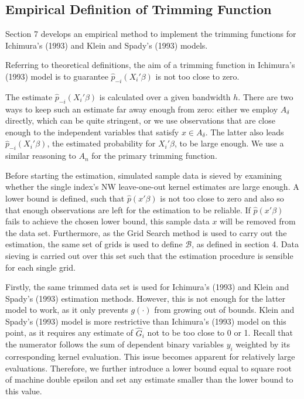 \documentclass[a4paper]{article}
\begin{document}
\subsection{Empirical Definition of Trimming Function}
Section 7 develops an empirical method to implement the trimming functions for Ichimura's (1993) \cite{[6]} and Klein and Spady's (1993) \cite{[12]} models.

Referring to theoretical definitions, the aim of a trimming function in Ichimura's (1993) \citep{[6]} model is to guarantee $\hat{p}_{-i}(X_i'\beta)$ is not too close to zero. 

The estimate $\hat{p}_{-i}(X_i'\beta)$ is calculated over a given bandwidth $h$. There are two ways to keep such an estimate far away enough from zero: either we  employ $A_\delta$  directly, which can be quite stringent, or we use observations that are close enough to the independent variables that satisfy $x \in A_\delta$. The latter also leads $\hat{p}_{-i}(X_i'\beta)$, the estimated probability for $X_i'\beta$, to be large enough. We use a similar reasoning to $A_n$ for the primary trimming function.

Before starting the estimation, simulated sample data is sieved by examining whether the single index's NW leave-one-out kernel estimates are large enough. A lower bound is defined, such that $\hat{p}(x'\beta)$ is not too close to zero and also so that enough observations are left  for the estimation to be reliable. If $\hat{p}(x'\beta)$ fails to achieve the chosen lower bound, this sample data $x$ will be removed from the data set.
Furthermore, as the Grid Search method is used to carry out the estimation, the same set of grids is used to define $\mathcal{B}$, as defined in section 4. Data sieving is carried out over this set such that the estimation procedure is sensible for each single grid.

Firstly, the same trimmed data set is used for Ichimura's (1993) \cite{[6]} and Klein and Spady's (1993) \cite{[12]} estimation methods. However, this is not enough for the latter model to work, as it only prevents $g(\cdot)$ from growing out of bounds.  Klein and Spady's (1993) \cite{[12]} model is more restrictive than Ichimura's (1993) \cite{[6]} model on this point, as it requires any estimate of $\hat{G}_i$ not to be too close to 0 or 1. Recall that the numerator follows the sum of dependent binary variables $y_i$ weighted by its corresponding kernel evaluation. This issue becomes apparent for relatively large evaluations. Therefore, we further introduce a lower bound equal to square root of machine double epsilon and set any estimate smaller than the lower bound to this value.
\end{document}
